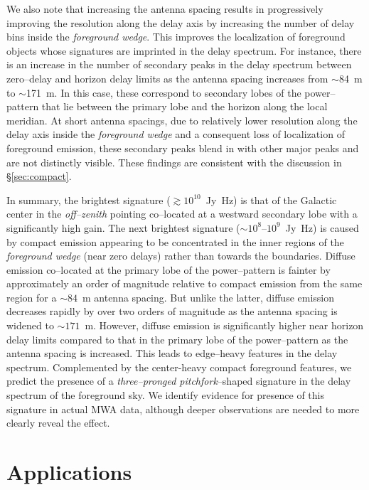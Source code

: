 \documentclass[preprint2,iop,numberedappendix]{emulateapj}
\begin{document}
We also note that increasing the antenna spacing results in progressively improving the resolution along the delay axis by increasing the number of delay bins inside the {\it foreground wedge}. This improves the localization of foreground objects whose signatures are imprinted in the delay spectrum. For instance, there is an increase in the number of secondary peaks in the delay spectrum between zero--delay and horizon delay limits as the antenna spacing increases from $\sim$84~m to $\sim$171~m. In this case, these correspond to secondary lobes of the power--pattern that lie between the primary lobe and the horizon along the local meridian. At short antenna spacings, due to relatively lower resolution along the delay axis inside the {\it foreground wedge} and a consequent loss of localization of foreground emission, these secondary peaks blend in with other major peaks and are not distinctly visible. These findings are consistent with the discussion in \S\ref{sec:compact}.

In summary, the brightest signature ($\gtrsim 10^{10}$~Jy~Hz) is that of the Galactic center in the {\it off--zenith} pointing co--located at a westward secondary lobe with a significantly high gain. The next brightest signature ($\sim 10^8$--$10^9$~Jy~Hz) is caused by compact emission appearing to be concentrated in the inner regions of the {\it foreground wedge} (near zero delays) rather than towards the boundaries. Diffuse emission co--located at the primary lobe of the power--pattern is fainter by approximately an order of magnitude relative to compact emission from the same region for a $\sim 84$~m antenna spacing. But unlike the latter, diffuse emission decreases rapidly by over two orders of magnitude as the antenna spacing is widened to $\sim 171$~m. However, diffuse emission is significantly higher near horizon delay limits compared to that in the primary lobe of the power--pattern as the antenna spacing is increased. This leads to edge--heavy features in the delay spectrum. Complemented by the center-heavy compact foreground features, we predict the presence of a {\it three--pronged pitchfork}--shaped signature in the delay spectrum of the foreground sky. We identify evidence for presence of this signature in actual MWA data, although deeper observations are needed to more clearly reveal the effect.

\section{Applications}\label{sec:fg-grading}
\end{document}
